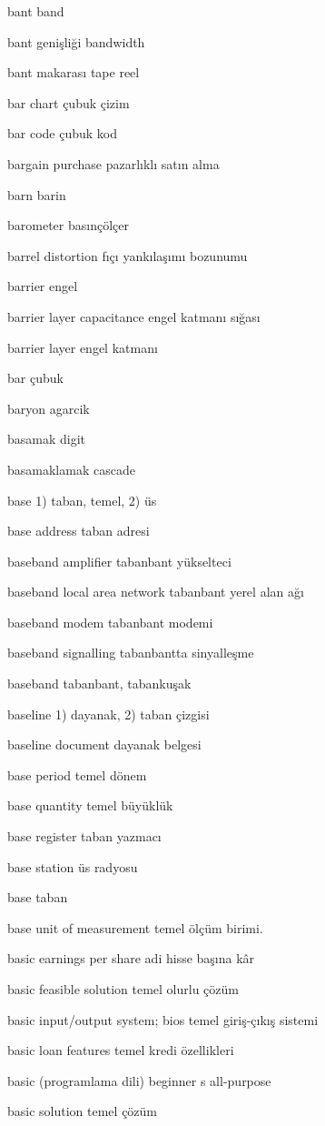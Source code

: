 \documentclass[12pt,fleqn]{article}\usepackage{../../common}
\begin{document}
bant band

bant genişliği bandwidth

bant makarası tape reel

bar chart çubuk çizim

bar code çubuk kod

bargain purchase pazarlıklı satın alma

barn barin

barometer basınçölçer

barrel distortion fıçı yankılaşımı bozunumu

barrier engel

barrier layer capacitance engel katmanı sığası

barrier layer engel katmanı

bar çubuk

baryon agarcik

basamak digit

basamaklamak cascade

base 1) taban, temel, 2) üs

base address taban adresi

baseband amplifier tabanbant yükselteci

baseband local area network tabanbant yerel alan ağı

baseband modem tabanbant modemi

baseband signalling tabanbantta sinyalleşme

baseband tabanbant, tabankuşak

baseline 1) dayanak, 2) taban çizgisi

baseline document dayanak belgesi

base period temel dönem

base quantity temel büyüklük

base register taban yazmacı

base station üs radyosu

base taban

base unit of measurement temel ölçüm birimi.

basic earnings per share adi hisse başına kâr

basic feasible solution temel olurlu çözüm

basic input/output system; bios temel giriş-çıkış sistemi

basic loan features temel kredi özellikleri

basic (programlama dili) beginner s all-purpose

basic solution temel çözüm
\end{document}

